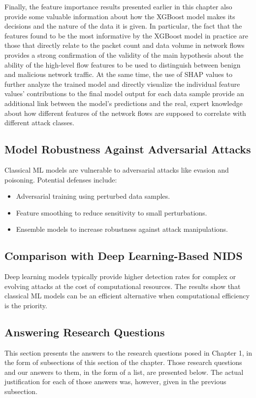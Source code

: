 Finally, the feature importance results presented earlier in this chapter also provide some valuable information about how the XGBoost model makes its decisions and the nature of the data it is given. In particular, the fact that the features found to be the most informative by the XGBoost model in practice are those that directly relate to the packet count and data volume in network flows provides a strong confirmation of the validity of the main hypothesis about the ability of the high-level flow features to be used to distinguish between benign and malicious network traffic. At the same time, the use of SHAP values to further analyze the trained model and directly visualize the individual feature values’ contributions to the final model output for each data sample provide an additional link between the model’s predictions and the real, expert knowledge about how different features of the network flows are supposed to correlate with different attack classes.

\subsection{Model Robustness Against Adversarial Attacks} 
Classical ML models are vulnerable to adversarial attacks like evasion and poisoning. Potential defenses include: 
\begin{itemize} 
	\item Adversarial training using perturbed data samples. 
	\item Feature smoothing to reduce sensitivity to small perturbations.
	\item Ensemble models to increase robustness against attack manipulations.
\end{itemize} 

\subsection{Comparison with Deep Learning-Based NIDS} 
Deep learning models typically provide higher detection rates for complex or evolving attacks at the cost of computational resources. The results show that classical ML models can be an efficient alternative when computational efficiency is the priority.

\subsection{Answering Research Questions}

This section presents the answers to the research questions posed in Chapter 1, in the form of subsections of this section of the chapter. Those research questions and our answers to them, in the form of a list, are presented below. The actual justification for each of those answers was, however, given in the previous subsection.

